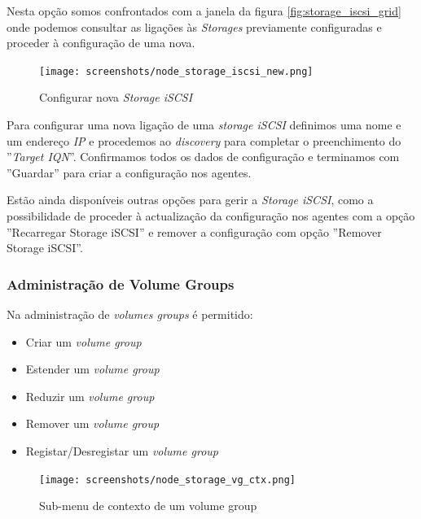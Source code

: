 Nesta opção somos confrontados com a janela da figura \ref{fig:storage_iscsi_grid} onde podemos consultar as ligações às \emph{Storages} previamente configuradas e proceder à configuração de uma nova.

\begin{figure}[H]
        \begin{center}
        \texttt{[image: screenshots/node\_storage\_iscsi\_new.png]}
        \caption{Configurar nova \emph{Storage iSCSI} }
        \label{fig:storage_iscsi_new}
        \end{center}
\end{figure}

Para configurar uma nova ligação de uma \emph{storage iSCSI} definimos uma nome e um endereço \emph{IP} e procedemos ao \emph{discovery} para completar o preenchimento do ''\emph{Target IQN}''. Confirmamos todos os dados de configuração e terminamos com ''Guardar'' para criar a configuração nos agentes.

Estão ainda disponíveis outras opções para gerir a \emph{Storage iSCSI}, como a possibilidade de proceder à actualização da configuração nos agentes com a opção ''Recarregar Storage iSCSI'' e remover a configuração com opção ''Remover Storage iSCSI''.


\subsubsection{Administração de Volume Groups}
Na administração de \emph{volumes groups} é permitido:
\begin{itemize}
	\item Criar um \emph{volume group}
	\item Estender um \emph{volume group}
	\item Reduzir um \emph{volume group}
	\item Remover um \emph{volume group}
    \item Registar/Desregistar um \emph{volume group}
\end{itemize}

\begin{figure}[H]
        \begin{center}
        \texttt{[image: screenshots/node\_storage\_vg\_ctx.png]}
        \caption{Sub-menu de contexto de um volume group}
        \label{fig:storage_vg_ctx}
        \end{center}
\end{figure}

